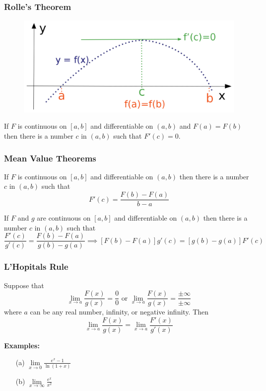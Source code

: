 \documentclass{beamer}
\begin{document}
\begin{frame}
\frametitle{\textbf{Rolle's Theorem}}
\begin{figure}
	\centering
	\includegraphics[height=.4\textheight]{rolles.png}\\
	\hspace*{10pt}\hbox{}
\end{figure}

\begin{theorem}
	If $F$ is continuous on $[a,b]$ and differentiable on $(a,b)$ and $F(a)=F(b)$ then there is a number $c$ in $(a,b)$ such that $F'(c)=0$.
\end{theorem}
\end{frame}

\begin{frame}
\frametitle{\textbf{Mean Value Theorems}}

\begin{theorem}
	If $F$ is continuous on $[a,b]$ and differentiable on $(a,b)$ then there is a number $c$ in $(a,b)$ such that
	$$F'(c) = \frac{F(b)-F(a)}{b-a}$$
\end{theorem}

\begin{theorem}
	If $F$ and $g$ are continuous on $[a,b]$ and differentiable on $(a,b)$ then there is a number $c$ in $(a,b)$ such that
	$$\frac{F'(c)}{g'(c)} = \frac{F(b)-F(a)}{g(b)-g(a)} \implies [F(b)-F(a)]g'(c) = [g(b)-g(a)]F'(c)$$
\end{theorem}

\end{frame}



\begin{frame}
\frametitle{\textbf{L'Hopitals Rule}}
\begin{theorem}
	Suppose that $$\lim\limits_{x \to a} \frac{F(x)}{g(x)} = \frac{0}{0} \mbox{ or } \lim\limits_{x \to a}\frac{ F(x)}{g(x)}=\frac{ \pm \infty}{\pm \infty}$$ 
where $a$ can be any real number, infinity, or negative infinity. Then
$$\lim\limits_{x \to a} \frac{F(x)}{g(x)}=\lim\limits_{x \to a} \frac{F'(x)}{g'(x)}$$
\end{theorem}
\vspace{6pt}
\textbf{Examples:}
\begin{itemize}
	\item[(a)] $\lim\limits_{x\to 0} \frac{e^x-1}{\ln(1+x)}$
	\item[(b)] $\lim\limits_{x\to \infty} \frac{e^x}{x^2}$
\end{itemize}
\end{frame}
\end{document}
